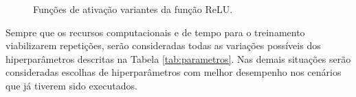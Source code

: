 \begin{figure}[h!]
	\centering
	\caption{Funções de ativação variantes da função ReLU.}\label{fig:relu-variants}
	\hfill
\end{figure}


Sempre que os recursos computacionais e de tempo para o treinamento viabilizarem repetições, serão consideradas todas as variações possíveis dos hiperparâmetros descritas na Tabela \ref{tab:parametros}. Nas demais situações serão consideradas escolhas de hiperparâmetros com melhor desempenho nos cenários que já tiverem sido executados.
